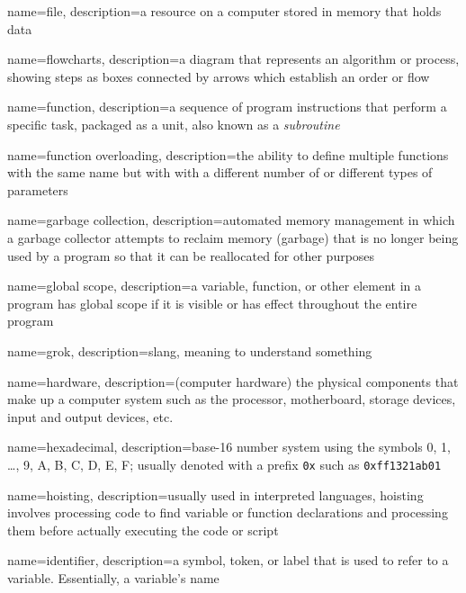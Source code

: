 {
  name=file,
  description={a resource on a computer stored in memory that holds data}
}

{
  name=flowcharts,
  description={a diagram that represents an algorithm or process, showing steps as boxes connected by arrows which establish an
  order or flow}
}

{
  name=function,
  description={a sequence of program instructions that perform a specific task, packaged as a unit, also
  known as a \emph{subroutine}}
}

{
  name=function overloading,
  description={the ability to define multiple functions with the same name but with with a different number of or different types of parameters}
}

{
  name=garbage collection,
  description={automated memory management in which a garbage collector attempts to reclaim memory (garbage) that is no
	longer being used by a program so that it can be reallocated for other purposes}
}

{
  name=global scope,
  description={a variable, function, or other element in a program has global scope if it is visible or has effect throughout
  	the entire program}
}

{
  name=grok,
  description={slang, meaning to understand something}
}

{
  name=hardware,
  description={(computer hardware) the physical components that make up a computer system such as the processor, motherboard, storage devices, input and output devices, etc.}
}

{
  name=hexadecimal,
  description={base-16 number system using the symbols 0, 1, \ldots, 9, A, B, C, D, E, F; usually denoted with a prefix \texttt{0x} such as
\texttt{0xff1321ab01}}
}


{
  name=hoisting,
  description={usually used in interpreted languages, hoisting involves processing code to find variable or function declarations and processing them before actually executing the code or script}
}

{
  name=identifier,
  description={a symbol, token, or label that is used to refer to a variable.  Essentially, a variable's name}
}

